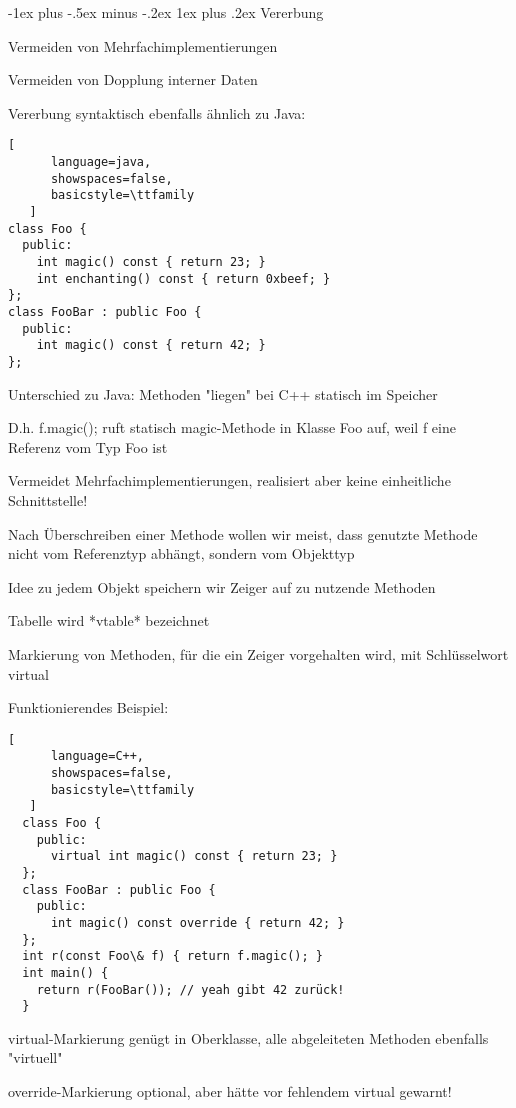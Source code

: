 \documentclass[10pt]{article}
\makeatletter
\renewcommand{\subsubsection}{\@startsection{subsubsection}{3}{0mm}%
                                {-1ex plus -.5ex minus -.2ex}%
                                {1ex plus .2ex}%
                                {\normalfont\small\bfseries}}
\makeatother
\begin{document}
\subsubsection{Vererbung}
\begin{itemize*}
  \item Vermeiden von Mehrfachimplementierungen
  \item Vermeiden von Dopplung interner Daten
  \item Vererbung syntaktisch ebenfalls ähnlich zu Java:
  \begin{lstlisting}[
      language=java,
      showspaces=false,
      basicstyle=\ttfamily
   ]
class Foo {
  public:
    int magic() const { return 23; }
    int enchanting() const { return 0xbeef; }
};
class FooBar : public Foo {
  public:
    int magic() const { return 42; }
};
\end{lstlisting}
\end{itemize*}

\begin{itemize*}
  \item Unterschied zu Java: Methoden "liegen" bei C++ statisch im Speicher
  \begin{itemize*}
    \item D.h. f.magic(); ruft statisch magic-Methode in Klasse Foo auf, weil f eine Referenz vom Typ Foo ist
    \item Vermeidet Mehrfachimplementierungen, realisiert aber keine einheitliche Schnittstelle!
  \end{itemize*}
  \item Nach Überschreiben einer Methode wollen wir meist, dass genutzte Methode nicht vom Referenztyp abhängt, sondern vom Objekttyp
  \begin{itemize*}
    \item Idee zu jedem Objekt speichern wir Zeiger auf zu nutzende Methoden
    \item Tabelle wird *vtable* bezeichnet
    \item Markierung von Methoden, für die ein Zeiger vorgehalten wird, mit Schlüsselwort virtual
    \item Funktionierendes Beispiel:
    \begin{lstlisting}[
      language=C++,
      showspaces=false,
      basicstyle=\ttfamily
   ]
  class Foo {
    public:
      virtual int magic() const { return 23; }
  };
  class FooBar : public Foo {
    public:
      int magic() const override { return 42; }
  };
  int r(const Foo\& f) { return f.magic(); }
  int main() {
    return r(FooBar()); // yeah gibt 42 zurück!
  }
  \end{lstlisting}
    \item virtual-Markierung genügt in Oberklasse, alle abgeleiteten Methoden ebenfalls "virtuell"
    \item override-Markierung optional, aber hätte vor fehlendem virtual gewarnt!
  \end{itemize*}
\end{itemize*}
\end{document}
